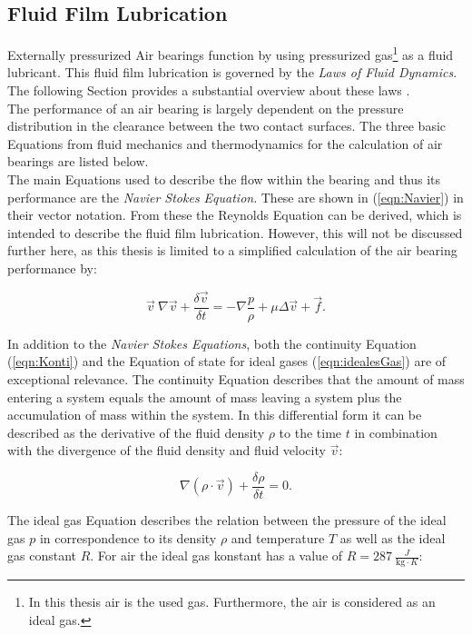 \subsection{Fluid Film Lubrication}
\label{sec:lubrication}
Externally pressurized Air bearings function by using pressurized gas\footnote{In this thesis air is the used gas. Furthermore, the air is considered as an ideal gas.} as a fluid lubricant. This fluid film lubrication is governed by the \textit{Laws of Fluid Dynamics}. The following Section provides a substantial overview about these laws \cite{Hamrock.1991}.\\ 


The performance of an air bearing is largely dependent on the pressure distribution in the clearance between the two contact surfaces. The three basic Equations from fluid mechanics and thermodynamics for the calculation of air bearings are listed below.\\The main Equations used to describe the flow within the bearing and thus its performance are the \textit{Navier Stokes Equation}. These are shown in (\ref{eqn:Navier}) in their vector notation. From these the Reynolds Equation can be derived, which is intended to describe the fluid film lubrication. However, this will not be discussed further here, as this thesis is limited to a simplified calculation of the air bearing performance by:

\begin{equation}
\vec{v} \ \nabla \vec{v} + \frac{\delta \vec{v}}{\delta t} = - \nabla \frac{p}{\rho} + \mu \Delta \vec{v} + \vec{f} .
\label{eqn:Navier}
\end{equation}

In addition to the \textit{Navier Stokes Equations}, both the continuity Equation (\ref{eqn:Konti}) and the Equation of state for ideal gases (\ref{eqn:idealesGas}) are of exceptional relevance. The continuity Equation describes that the amount of mass entering a system equals the amount of mass leaving a system plus the accumulation of mass within the system. In this differential form it can be described as the derivative of the fluid density $\rho$ to the time $t$ in combination with the divergence of the fluid density and fluid velocity $\vec{v}$:

\begin{equation}
\nabla(\rho \cdot \vec{v}) + \frac{\delta \rho}{\delta t} = 0 .
\label{eqn:Konti}
\end{equation}

The ideal gas Equation describes the relation between the pressure of the ideal gas $p$ in correspondence to its density $\rho$ and temperature $T$ as well as the ideal gas constant $R$. For air the ideal gas konstant has a value of $R = 287 \ \frac{J}{\text{kg} \cdot K}$:


